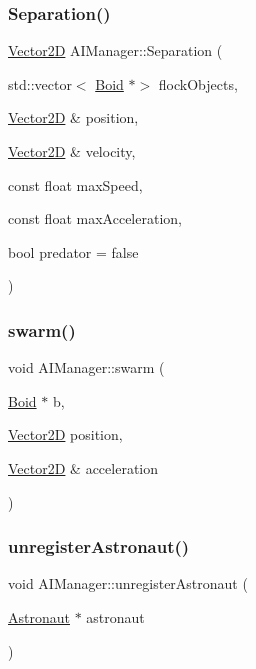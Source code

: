 \subsubsection{\texorpdfstring{Separation()}{Separation()}}
{\footnotesize\ttfamily \hyperlink{class_vector2_d}{Vector2D} A\+I\+Manager\+::\+Separation (\begin{DoxyParamCaption}\item[{std\+::vector$<$ \hyperlink{class_boid}{Boid} $\ast$$>$}]{flock\+Objects,  }\item[{\hyperlink{class_vector2_d}{Vector2D} \&}]{position,  }\item[{\hyperlink{class_vector2_d}{Vector2D} \&}]{velocity,  }\item[{const float}]{max\+Speed,  }\item[{const float}]{max\+Acceleration,  }\item[{bool}]{predator = {\ttfamily false} }\end{DoxyParamCaption})\hspace{0.3cm}{\ttfamily [static]}}

\hypertarget{class_a_i_manager_a69a2ee2acf0bc9a11370a2f2aa88e986}{}\label{class_a_i_manager_a69a2ee2acf0bc9a11370a2f2aa88e986} 
\subsubsection{\texorpdfstring{swarm()}{swarm()}}
{\footnotesize\ttfamily void A\+I\+Manager\+::swarm (\begin{DoxyParamCaption}\item[{\hyperlink{class_boid}{Boid} $\ast$}]{b,  }\item[{\hyperlink{class_vector2_d}{Vector2D}}]{position,  }\item[{\hyperlink{class_vector2_d}{Vector2D} \&}]{acceleration }\end{DoxyParamCaption})\hspace{0.3cm}{\ttfamily [static]}}

\hypertarget{class_a_i_manager_a202fdf78a138904ef96a3a5b5ccbbe30}{}\label{class_a_i_manager_a202fdf78a138904ef96a3a5b5ccbbe30} 
\subsubsection{\texorpdfstring{unregister\+Astronaut()}{unregisterAstronaut()}}
{\footnotesize\ttfamily void A\+I\+Manager\+::unregister\+Astronaut (\begin{DoxyParamCaption}\item[{\hyperlink{class_astronaut}{Astronaut} $\ast$}]{astronaut }\end{DoxyParamCaption})\hspace{0.3cm}{\ttfamily [static]}}

